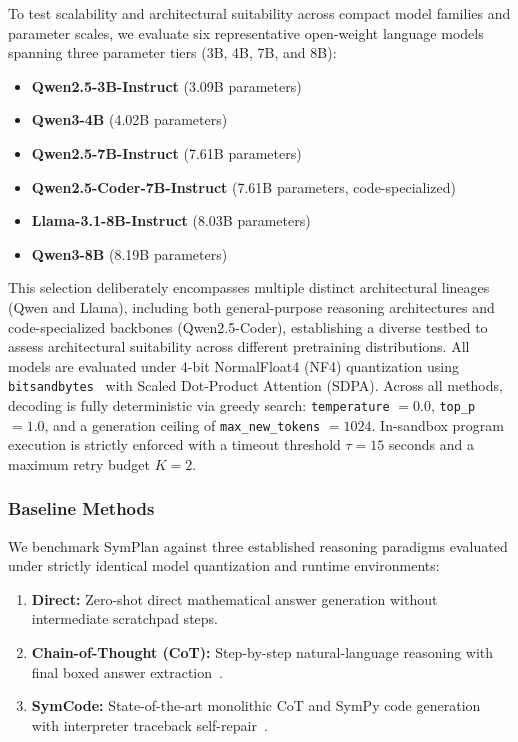 \documentclass[conference,a4paper]{IEEEtran}
\begin{document}
To test scalability and architectural suitability across compact model families and parameter scales, we evaluate six representative open-weight language models spanning three parameter tiers (3B, 4B, 7B, and 8B):
\begin{itemize}
    \item \textbf{Qwen2.5-3B-Instruct} (3.09B parameters)~\cite{qwen2024qwen25}
    \item \textbf{Qwen3-4B} (4.02B parameters)~\cite{qwen2024qwen25}
    \item \textbf{Qwen2.5-7B-Instruct} (7.61B parameters)~\cite{qwen2024qwen25}
    \item \textbf{Qwen2.5-Coder-7B-Instruct} (7.61B parameters, code-specialized)~\cite{hui2024qwen25coder}
    \item \textbf{Llama-3.1-8B-Instruct} (8.03B parameters)~\cite{dubey2024llama3}
    \item \textbf{Qwen3-8B} (8.19B parameters)~\cite{qwen2024qwen25}
\end{itemize}
This selection deliberately encompasses multiple distinct architectural lineages (Qwen and Llama), including both general-purpose reasoning architectures and code-specialized backbones (Qwen2.5-Coder), establishing a diverse testbed to assess architectural suitability across different pretraining distributions. All models are evaluated under 4-bit NormalFloat4 (NF4) quantization using \texttt{bitsandbytes}~\cite{dettmers2023qlora} with Scaled Dot-Product Attention (SDPA). Across all methods, decoding is fully deterministic via greedy search: \texttt{temperature} $= 0.0$, \texttt{top\_p} $= 1.0$, and a generation ceiling of \texttt{max\_new\_tokens} $= 1024$. In-sandbox program execution is strictly enforced with a timeout threshold $\tau = 15$ seconds and a maximum retry budget $K = 2$.

\subsubsection{Baseline Methods}

We benchmark SymPlan against three established reasoning paradigms evaluated under strictly identical model quantization and runtime environments:
\begin{enumerate}
    \item \textbf{Direct:} Zero-shot direct mathematical answer generation without intermediate scratchpad steps.
    \item \textbf{Chain-of-Thought (CoT):} Step-by-step natural-language reasoning with final boxed answer extraction~\cite{wei2022cot}.
    \item \textbf{SymCode:} State-of-the-art monolithic CoT and SymPy code generation with interpreter traceback self-repair~\cite{nezhad2025symcode}.
\end{enumerate}
\end{document}
